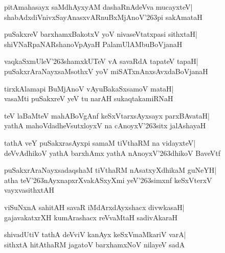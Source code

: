 \documentclass[twoside,12pt,openright]{book}
\def\S{\char'263}
\newcounter{shloka}[chapter]
\begin{document}
\begin{shloka}%
pitAmahasayx saMdhAyxyAM dashaRnAdeVva mucayxteV|\\
shabAdxdiVnivxSayAnasxvARnuBxMjAnoV\S pi sakAmataH
\end{shloka}

\begin{shloka}%
puSakxreV barxhamxBakotxV yoV nivaseVtatxpasi sithxtaH|\\
shiVNaRpaNARshanoVpAyaH PalamUlAMbuBoVjanaH
\end{shloka}

\begin{shloka}%
vaqkaSxmUleV\S shamxkUTeV vA savaRdA tapateV tapaH|\\
puSakxrAraNayxsaMsothxV yoV miSATxnAnxsAvxdaBoVjanaH
\end{shloka}

\begin{shloka}%
tirxkAlamapi BuMjAnoV vAyuBakaSxsamoV mataH|\\
vasaMti puSakxreV yeV tu narAH sukaqtakamiRNaH
\end{shloka}

\begin{shloka}%
teV laBaMteV mahABoVgAnf keSxVtarxsAyxsayx parxBAvataH|\\
yathA mahoVdadheVsutxloyxV na cAnoyxV\S sitx jalAshayaH
\end{shloka}

\begin{shloka}%
tathA veY puSakxrasAyxpi samaM tiVthaRM na vidayxteV|\\
deVvAdhikoV yathA barxhAmx yathA nAnoyxV\S dhikoV BaveVtf
\end{shloka}

\begin{shloka}%
puSakxrAraNayxsadaqshaM tiVthaRM nAsatxyXdhikaM guNeYH|\\
atha teV\S nAyxnapxrXvakASxyXmi yeV\S simxnf keSxVterxV vayxvasithxtAH
\end{shloka}

\begin{shloka}%
viSuNxnA sahitAH savaR iMdArxdAyxshacx divwkasaH|\\
gajavakatxrXH kumArashacx reVvaMtaH sadivAkaraH
\end{shloka}

\begin{shloka}%
shivadUtiV tathA deVviV kanAyx keSxVmaMkariV varA|\\
sithxtA hitAthaRM jagatoV barxhamxNoV nilayeV sadA
\end{shloka}
\end{document}
